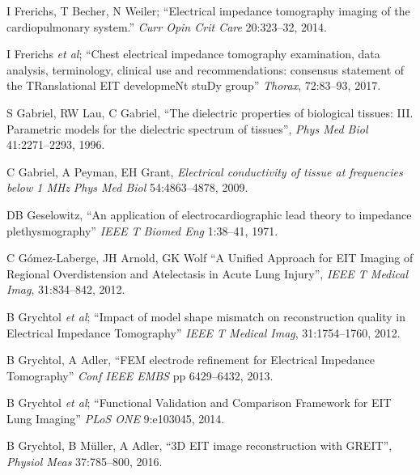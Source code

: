 \documentclass[12pt]{article} \usepackage[margin=3cm]{geometry} \usepackage[margin=20pt,font=small,labelfont=bf]{caption}\def\TBLWIDA{35mm}\def\TBLWIDB{95mm}
\newcommand{\ifmaxthree}[2]{#2 {\em et al}; }
\begin{document}
\begin{thebibliography}{00}
I Frerichs, T Becher, N Weiler; 
``Electrical impedance tomography imaging of the cardiopulmonary system.''
{\em Curr Opin Crit Care} 20:323--32, 2014.

\ifmaxthree{
I Frerichs, M Amato, A Van Kaam, D Tingay, Z Zhao, B Grychtol, M Bodenstein,
H; Gagnon, S Böhm, E Teschner, O Stenqvist, T Mauri, V Torsani, C Luigi,
A Schibler, G Wolf, D Gommers, S Leonhardt, A Adler
}{
I Frerichs
}
``Chest electrical impedance tomography
examination, data analysis, terminology, clinical use and recommendations:
consensus statement of the TRanslational EIT developmeNt stuDy group''
{\em Thorax}, 72:83--93, 2017.


S Gabriel, RW Lau, C Gabriel,
``The dielectric properties of biological tissues: III. Parametric models for the dielectric spectrum of tissues'',
{\em  Phys Med Biol} 41:2271--2293, 1996.

C Gabriel, A Peyman, EH Grant,
{\em Electrical conductivity of tissue at frequencies below 1 MHz}
{\em Phys Med Biol} 54:4863--4878, 2009.

DB Geselowitz, 
``An application of electrocardiographic lead theory to impedance
plethysmography''
{\em  IEEE T Biomed Eng} 1:38--41, 1971.

C Gómez-Laberge, JH Arnold, GK Wolf
``A Unified Approach for EIT Imaging of Regional Overdistension and Atelectasis
in Acute Lung Injury'',
{\em IEEE T Medical Imag}, 31:834--842, 2012.

\ifmaxthree{
B Grychtol, WRB Lionheart, M Bodenstein, GK Wolf, A Adler
}{
B Grychtol
}
``Impact of model shape mismatch on reconstruction quality in Electrical Impedance Tomography''
{\em IEEE T Medical Imag}, 31:1754--1760, 2012.

B Grychtol, A Adler,
``FEM electrode refinement for Electrical Impedance Tomography''
{\em Conf IEEE EMBS} pp 6429--6432, 2013. %

\ifmaxthree{
B Grychtol, G Elke, P Meybohm, N Weiler, I Frerichs, A Adler,
}{
B Grychtol
}
``Functional Validation and Comparison Framework for EIT Lung Imaging''
{\em PLoS ONE} 9:e103045, 2014.

B Grychtol, B Müller, A Adler,
``3D EIT image reconstruction with GREIT'',
{\em Physiol Meas} 37:785--800, 2016.


\end{thebibliography}
\end{document}
